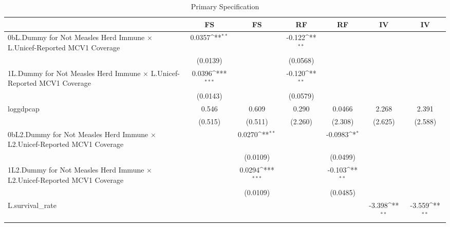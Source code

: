 \begin{table}[htbp]\centering
\def\sym#1{\ifmmode^{#1}\else\(^{#1}\)\fi}
\caption{Primary Specification}
\begin{tabular}{l*{6}{c}}
\toprule
                &\multicolumn{1}{c}{FS}&\multicolumn{1}{c}{FS}&\multicolumn{1}{c}{RF}&\multicolumn{1}{c}{RF}&\multicolumn{1}{c}{IV}&\multicolumn{1}{c}{IV}\\
\midrule
0bL.Dummy for Not Measles Herd Immune $\times$ L.Unicef-Reported MCV1 Coverage&   0.0357\sym{**} &                  &   -0.122\sym{**} &                  &                  &                  \\
                & (0.0139)         &                  & (0.0568)         &                  &                  &                  \\
\addlinespace
1L.Dummy for Not Measles Herd Immune $\times$ L.Unicef-Reported MCV1 Coverage&   0.0396\sym{***}&                  &   -0.120\sym{**} &                  &                  &                  \\
                & (0.0143)         &                  & (0.0579)         &                  &                  &                  \\
\addlinespace
loggdpcap       &    0.546         &    0.609         &    0.290         &   0.0466         &    2.268         &    2.391         \\
                &  (0.515)         &  (0.511)         &  (2.260)         &  (2.308)         &  (2.625)         &  (2.588)         \\
\addlinespace
0bL2.Dummy for Not Measles Herd Immune $\times$ L2.Unicef-Reported MCV1 Coverage&                  &   0.0270\sym{**} &                  &  -0.0983\sym{*}  &                  &                  \\
                &                  & (0.0109)         &                  & (0.0499)         &                  &                  \\
\addlinespace
1L2.Dummy for Not Measles Herd Immune $\times$ L2.Unicef-Reported MCV1 Coverage&                  &   0.0294\sym{***}&                  &   -0.103\sym{**} &                  &                  \\
                &                  & (0.0109)         &                  & (0.0485)         &                  &                  \\
\addlinespace
L.survival\_rate &                  &                  &                  &                  &   -3.398\sym{**} &   -3.559\sym{**} \\

\end{tabular}
\end{table}

